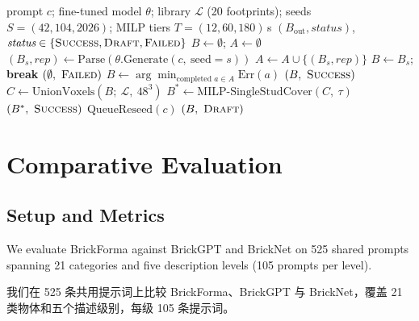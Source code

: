 \documentclass[11pt,letterpaper]{article}
\newcommand{\zh}[1]{{\chinesefont #1}}
\newcommand{\pair}[2]{\par\addvspace{4pt}\noindent
  \begin{minipage}{\linewidth}\raggedright
  #1\par\nobreak\vspace{1pt}
  {\color{translation}\chinesefont\fontsize{10.5}{15.3}\selectfont #2\par}
  \end{minipage}\par}
\begin{document}
\begin{algorithm}[!htbp]
\caption{BrickForma inference and refinement}
\label{alg:inference-refinement}
\small
\begin{algorithmic}[1]
\REQUIRE prompt $c$; fine-tuned model $\theta$; library $\mathcal{L}$ (20 footprints); seeds $S=(42,104,2026)$; MILP tiers $T=(12,60,180)$\,s
\ENSURE $(B_{\mathrm{out}}, \textit{status})$, $\textit{status}\in\{\textsc{Success},\textsc{Draft},\textsc{Failed}\}$
\STATE $B \gets \emptyset$; $A \gets \emptyset$
\STATE $(B_s,\textit{rep}) \gets \mathrm{Parse}(\theta.\mathrm{Generate}(c,\ \mathrm{seed}{=}s))$
\STATE $A \gets A \cup \{(B_s,\textit{rep})\}$
\STATE $B \gets B_s$; \textbf{break}
\ENDIF
\ENDFOR
{}
\RETURN $(\emptyset,\ \textsc{Failed})$
\ENDIF
\STATE $B \gets \arg\min_{\text{completed } a\in A} \mathrm{Err}(a)$
\ENDIF
{}
\RETURN $(B,\ \textsc{Success})$ 
\ENDIF
\STATE $C \gets \mathrm{UnionVoxels}(B;\ \mathcal{L},\ 48^3)$ 
\STATE $B^{*} \gets \mathrm{MILP\text{-}SingleStudCover}(C,\ \tau)$
\RETURN $(B^{*},\ \textsc{Success})$
\ENDIF
\ENDFOR
\STATE $\mathrm{QueueReseed}(c)$
\RETURN $(B,\ \textsc{Draft})$ 
\end{algorithmic}
\end{algorithm}

\section{Comparative Evaluation\enspace\zh{对比评测}}

\label{sec:eval}

\subsection{Setup and Metrics\enspace\zh{实验设置与指标}}

\label{sec:setup}

\pair{We evaluate BrickForma against BrickGPT and BrickNet on 525 shared prompts spanning 21 categories and five description levels (105 prompts per level).}{我们在 525 条共用提示词上比较 BrickForma、BrickGPT 与 BrickNet，覆盖 21 类物体和五个描述级别，每级 105 条提示词。}
\end{document}
